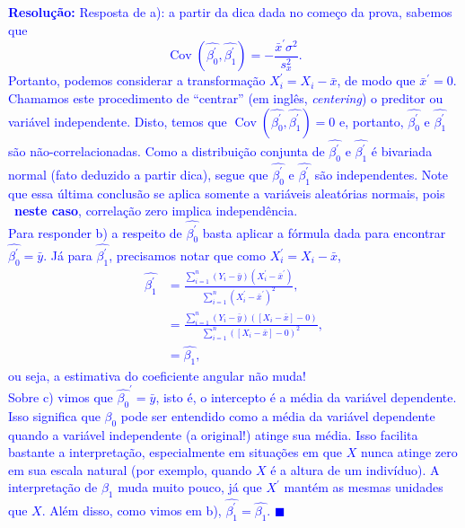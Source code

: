 \documentclass[a4paper,10pt, notitlepage]{report}
\begin{document}
\textcolor{blue}{
\textbf{Resolução:}
Resposta de a): a partir da dica dada no começo da prova, sabemos que 
$$ \operatorname{Cov}\left(\hat{\beta_0^\prime}, \hat{\beta_1^\prime} \right)  = -\frac{\bar{x}^\prime\sigma^2}{s_x^2}.$$
Portanto, podemos considerar a transformação $X_i^\prime = X_i -\bar{x}$, de modo que $\bar{x}^\prime = 0$.
Chamamos este procedimento de ``centrar'' (em inglês, \textit{centering}) o preditor ou variável independente.
Disto, temos que $\operatorname{Cov}\left(\hat{\beta_0^\prime}, \hat{\beta_1^\prime} \right)  = 0$ e, portanto, $\hat{\beta_0^\prime}$ e $\hat{\beta_1^\prime}$ são não-correlacionadas.
Como a distribuição conjunta de $\hat{\beta_0^\prime}$ e $\hat{\beta_1^\prime}$ é bivariada normal (fato deduzido a partir dica), segue que  $\hat{\beta_0^\prime}$ e $\hat{\beta_1^\prime}$ são independentes.
Note que essa última conclusão se aplica somente a variáveis aleatórias normais, pois ~\textbf{neste caso}, correlação zero implica independência.\\
Para responder b) a respeito de $\hat{\beta_0^\prime}$ basta aplicar a fórmula dada para encontrar $\hat{\beta_0^\prime} = \bar{y}$.
Já para $\hat{\beta_1^\prime}$, precisamos notar que como $X_i^\prime = X_i - \bar{x}$,
\begin{align*}
 \hat{\beta_1^\prime} &= \frac{\sum_{i=1}^n (Y_i-\bar{y})(X_i^\prime-\bar{x}^\prime)}{\sum_{i=1}^n \left(X_i^\prime - \bar{x}^\prime\right)^2},\\
 &= \frac{\sum_{i=1}^n (Y_i-\bar{y})([X_i-\bar{x}]-0)}{\sum_{i=1}^n \left( [X_i-\bar{x}] - 0\right)^2},\\
 &= \hat{\beta_1},
\end{align*}
ou seja, a estimativa do coeficiente angular não muda!\\
Sobre c) vimos que $\hat{\beta_0}^\prime = \bar{y}$, isto é, o intercepto é a média da variável dependente.
Isso significa que $\beta_0$ pode ser entendido como a média da variável dependente quando a variável independente (a original!) atinge sua média.
Isso facilita bastante a interpretação, especialmente em situações em que $X$ nunca atinge zero em sua escala natural (por exemplo, quando $X$ é a altura de um indivíduo).
A interpretação de $\beta_1$ muda muito pouco, já que $X^\prime$ mantém as mesmas unidades que $X$.
Além disso, como vimos em b), $\hat{\beta_1^\prime} = \hat{\beta_1}$.
$\blacksquare$
}

\newpage
\end{document}
